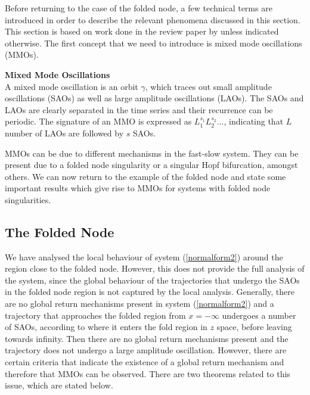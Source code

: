 \label{sec: MMO Oscilaltions} %

Before returning to the case of the folded node, a few technical terms are introduced in order to describe the relevant phenomena discussed in this section.
This section is based on work done in the review paper by \citet{MMO} unless indicated otherwise.
The first concept that we need to introduce is mixed mode oscillations (MMOs).

\begin{definition}{\textbf{Mixed Mode Oscillations} \citep{MMO}}\\
	A mixed mode oscillation is an orbit $\gamma$, which traces out small amplitude oscillations (SAOs) as well as large amplitude oscillations (LAOs).
	The SAOs and LAOs are clearly separated in the time series and their recurrence can be periodic.
	The signature of an MMO is expressed as $L_1^{s_1}L_2^{s_2}...$, indicating that $L$ number of LAOs are followed by $s$ SAOs.
\end{definition}
MMOs can be due to different mechanisms in the fast-slow system. They can be present due to a folded node singularity or a singular Hopf bifurcation, amongst others. We can now return to the example of the folded node and state some important results which give rise to MMOs for systems with folded node singularities.

\subsection{The Folded Node}
We have analysed the local behaviour of system (\ref{normalform2}) around the region close to the folded node.
However, this does not provide the full analysis of the system, since the global behaviour of the trajectories that undergo the SAOs in the folded node region is not captured by the local analysis.
Generally, there are no global return mechanisms present in system (\ref{normalform2}) and a trajectory that approaches the folded region from $x = - \infty$ undergoes a number of SAOs, according to where it enters the fold region in $z$ space, before leaving towards infinity. Then there are no global return mechanisms present and the trajectory does not undergo a large amplitude oscillation. However, there are certain criteria that indicate the existence of a global return mechanism and therefore that MMOs can be observed. There are two theorems related to this issue, which are stated below.

